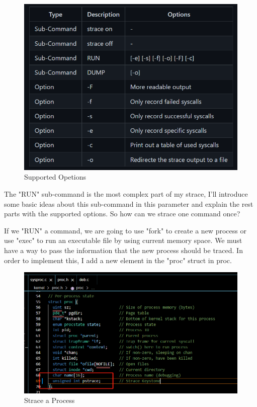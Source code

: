 \documentclass[11pt,oneside,a4paper]{article}
\begin{document}
\begin{figure}[H]
    \includegraphics[width=4.75in]{1-39.png}
    \centering
    \caption{Supported Opetions}
\end{figure}

The "RUN" sub-command is the most complex part of my strace, I'll introduce some 
basic ideas about this sub-command in this parameter and explain the rest parts with
the supported options. So how can we strace one command once?

If we "RUN" a command, we are going to use "fork" to create a new process or use 
"exec" to run an executable file by using current memory space. We must have a way to 
pass the information that the new process should be traced. In order to implement this,
I add a new element in the "proc" struct in proc.

\begin{figure}[H]
    \includegraphics[width=4.75in]{1-15.png}
    \centering
    \caption{Strace a Process}
\end{figure}
\end{document}
